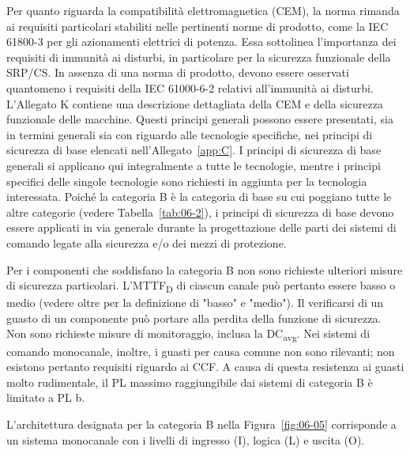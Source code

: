 Per quanto riguarda la compatibilità elettromagnetica (CEM), la norma rimanda ai requisiti particolari stabiliti nelle pertinenti norme di prodotto, come la IEC 61800-3 per gli azionamenti elettrici di potenza. Essa sottolinea l'importanza dei requisiti di immunità ai disturbi, in particolare per la sicurezza funzionale della SRP/CS. In assenza di una norma di prodotto, devono essere osservati quantomeno i requisiti della IEC 61000-6-2 relativi all'immunità ai disturbi. L'Allegato K contiene una descrizione dettagliata della CEM e della sicurezza funzionale delle macchine.
Questi principi generali possono essere presentati, sia in termini generali sia con riguardo alle tecnologie specifiche, nei principi di sicurezza di base elencati nell'Allegato~\ref{app:C}. I principi di sicurezza di base generali si applicano qui integralmente a tutte le tecnologie, mentre i principi specifici delle singole tecnologie sono richiesti in aggiunta per la tecnologia interessata. Poiché la categoria B è la categoria di base su cui poggiano tutte le altre categorie (vedere Tabella~\ref{tab:06-2}), i principi di sicurezza di base devono essere applicati in via generale durante la progettazione delle parti dei sistemi di comando legate alla sicurezza e/o dei mezzi di protezione.

Per i componenti che soddisfano la categoria B non sono richieste ulteriori misure di sicurezza particolari. L'MTTF\textsubscript{D} di ciascun canale può pertanto essere basso o medio (vedere oltre per la definizione di "basso" e "medio"). Il verificarsi di un guasto di un componente può portare alla perdita della funzione di sicurezza. Non sono richieste misure di monitoraggio, inclusa la DC\textsubscript{avg}. Nei sistemi di comando monocanale, inoltre, i guasti per causa comune non sono rilevanti; non esistono pertanto requisiti riguardo ai CCF.
A causa di questa resistenza ai guasti molto rudimentale, il PL massimo raggiungibile dai sistemi di categoria B è limitato a PL b.

L'architettura designata per la categoria B nella Figura~\ref{fig:06-05} corrisponde a un sistema monocanale con i livelli di ingresso (I), logica (L) e uscita (O).

\begin{center}
    \begin{minipage}{\textwidth}
        \centering
        \captionsetup{hypcap=false}
        \resizebox{0.75\textwidth}{!}{}
        \label{fig:06-05}
    \end{minipage}
\end{center}

